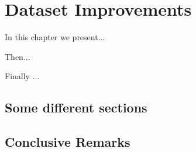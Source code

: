 \chapter{Dataset Improvements}
\label{chap:Improvements}
\pagestyle{plain}
\vspace{0.5cm}

\noindent In this chapter we present...

Then...

Finally ...


\section{Some different sections}

\section{Conclusive Remarks}
